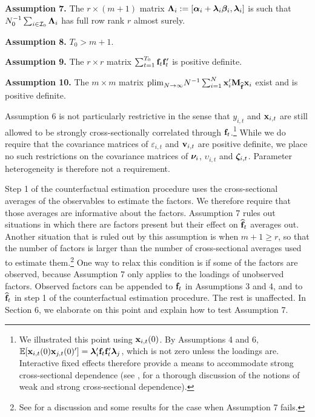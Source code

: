 \documentclass[12pt,fleqn]{article}
\begin{document}
  \bigskip
  
  \noindent \textbf{Assumption 7.} The $r\times (m+1)$ matrix $\boldsymbol{\Lambda}_i := [\boldsymbol{\alpha}_i +\boldsymbol{\lambda}_i\boldsymbol{\beta}_i, \boldsymbol{\lambda}_i]$ is such that $N_0^{-1}\sum_{i \in \mathcal{I}_{0}} \boldsymbol{\Lambda}_i$ has full row rank $r$ almost surely.
  
  \bigskip
  
  \noindent \textbf{Assumption 8.} $T_0 > m+1$.
  
  \bigskip
  
  \noindent \textbf{Assumption 9.} The $r \times r$ matrix $\sum_{t=1}^{T_0}\mathbf{f}_t\mathbf{f}_t'$ is positive definite.
  
  \bigskip
  
  \noindent \textbf{Assumption 10.} The $m \times m$ matrix $\mathrm{plim}_{N\to\infty}N^{-1}\sum_{i=1}^N \mathbf{x}_{i}'\mathbf{M}_{\widehat{\mathbf{f}}} \mathbf{x}_{i}$ exist and is positive definite.
  
  \bigskip
  
  Assumption 6 is not particularly restrictive in the sense that $y_{i,t}$ and $\mathbf{x}_{i,t}$ are still allowed to be strongly cross-sectionally correlated through $\mathbf{f}_{t}$.\footnote{We illustrated this point using $\mathbf{x}_{i,t}(0)$. By Assumptions 4 and 6, $\mathbb{E}[\mathbf{x}_{i,t}(0)\mathbf{x}_{j,t}(0)'] = \boldsymbol{\lambda}_i'\mathbf{f}_t\mathbf{f}_t'\boldsymbol{\lambda}_j$, which is not zero unless the loadings are. Interactive fixed effects therefore provide a means to accommodate strong cross-sectional dependence (see \citealp{chudik2011weak}, for a thorough discussion of the notions of weak and strong cross-sectional dependence).}  While we do require that the covariance matrices of $\varepsilon_{i,t}$ and $\mathbf{v}_{i,t}$ are positive definite, we place no such restrictions on the covariance matrices of $\boldsymbol{\nu}_i$, $\upsilon_{i,t}$ and $\boldsymbol{\zeta}_{i,t}$. Parameter heterogeneity is therefore not a requirement.
  
  Step 1 of the counterfactual estimation procedure uses the cross-sectional averages of the observables to estimate the factors. We therefore require that those averages are informative about the factors. Assumption 7 rules out situations in which there are factors present but their effect on $\widehat{\mathbf{f}}_t$ averages out. Another situation that is ruled out by this assumption is when $m+1 \geq r$, so that the number of factors is larger than the number of cross-sectional averages used to estimate them.\footnote{See \citet{Juodis_etal_2021} for a discussion and some results for the case when Assumption 7 fails.} One way to relax this condition is if some of the factors are observed, because Assumption 7 only applies to the loadings of unobserved factors. Observed factors can be appended to $\mathbf{f}_t$ in Assumptions 3 and 4, and to $\widehat{\mathbf{f}}_t$ in step 1 of the counterfactual estimation procedure. The rest is unaffected. In Section 6, we elaborate on this point and explain how to test Assumption 7.
  
\end{document}
